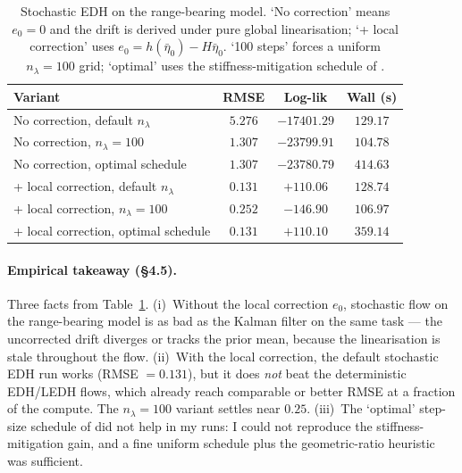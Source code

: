 \documentclass{article}
\begin{document}
\begin{table}[H]
\centering
\footnotesize
\caption{Stochastic EDH on the range-bearing model. `No correction' means $e_0 = 0$ and the drift is derived under pure global linearisation; `+ local correction' uses $e_0 = h(\bar\eta_0) - H\bar\eta_0$. `100 steps' forces a uniform $n_\lambda = 100$ grid; `optimal' uses the stiffness-mitigation schedule of \cite{ding2012implementation}.}
\label{tab:sde_flow}
\begin{tabular}{lccc}
\toprule
Variant & RMSE & Log-lik & Wall (s) \\
\midrule
No correction, default $n_\lambda$    & $5.276$ & $-17401.29$ & $129.17$ \\
No correction, $n_\lambda = 100$       & $1.307$ & $-23799.91$ & $104.78$ \\
No correction, optimal schedule         & $1.307$ & $-23780.79$ & $414.63$ \\
+ local correction, default $n_\lambda$ & $0.131$ & $+110.06$   & $128.74$ \\
+ local correction, $n_\lambda = 100$  & $0.252$ & $-146.90$   & $106.97$ \\
+ local correction, optimal schedule     & $0.131$ & $+110.10$   & $359.14$ \\
\bottomrule
\end{tabular}
\end{table}

\paragraph{Empirical takeaway (§4.5).} Three facts from Table~\ref{tab:sde_flow}. (i)~Without the local correction $e_0$, stochastic flow on the range-bearing model is as bad as the Kalman filter on the same task --- the uncorrected drift diverges or tracks the prior mean, because the linearisation is stale throughout the flow. (ii)~With the local correction, the default stochastic EDH run works (RMSE $=0.131$), but it does \emph{not} beat the deterministic EDH/LEDH flows, which already reach comparable or better RMSE at a fraction of the compute. The $n_\lambda=100$ variant settles near $0.25$. (iii)~The `optimal' step-size schedule of \cite{ding2012implementation} did not help in my runs: I could not reproduce the stiffness-mitigation gain, and a fine uniform schedule plus the geometric-ratio heuristic was sufficient. 
\end{document}
